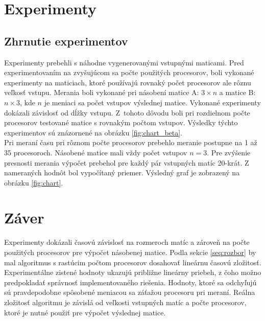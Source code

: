 \documentclass[a4paper, 14pt]{article}
\begin{document}

\section{Experimenty}


\subsection{Zhrnutie experimentov}
Experimenty prebehli s náhodne vygenerovanými vstupnými maticami. Pred experimentovaním na zvyšujúcom sa počte použitých procesorov, boli vykonané experimenty na maticiach, ktoré používajú rovnaký počet procesorov ale rôznu veľkosť vstupu. Merania boli vykonané pri násobení matice A: $3 \times n$ a matice B: $n \times 3$, kde $n$ je meniaci sa počet vstupov výslednej matice. Vykonané experimenty dokázali závislosť od dĺžky vstupu. Z~tohoto dôvodu boli pri rozdielnom počte procesorov testované matice s rovnakým počtom vstupov. Výsledky týchto experimentov sú znázornené na obrázku \ref{fig:chart_beta}.  \\
Pri meraní času pri rôznom počte procesorov prebehlo meranie postupne na 1 až 35 procesoroch. Násobené matice mali vždy počet vstupov $n=3$. Pre zvýšenie presnosti merania výpočet prebehol pre každý pár vstupných matíc 20\--krát. Z nameraných hodnôt bol vypočítaný priemer. Výsledný graf je zobrazený na obrázku \ref{fig:chart}.


\section{Záver}
Experimenty dokázali časovú závislosť na rozmeroch matíc a zároveň na počte použitých procesorov pre výpočet násobenej matice. Podla sekcie \ref{seq:rozbor} by mal algoritmus s rastúcim počtom procesorov dosahovať lineárnu časovú zložitosť.
Experimentálne zistené hodnoty ukazujú približne lineárny priebeh, z čoho možno predpokladať správnosť implementovaného riešenia. Hodnoty, ktoré sa odchyľujú sú pravdepodobne spôsobené meniacou sa záťažou procesoru pri meraní. Reálna zložitosť algoritmu je závislá od veľkosti vstupných matíc a počte procesorov, ktoré je nutné použiť pre výpočet výslednej matice.
\end{document}
